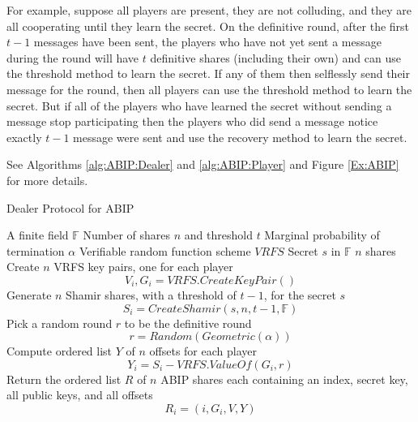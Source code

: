 \documentclass{dalcsthesis}
\begin{document}
For example, suppose all players are present, they are not colluding, and they are all cooperating until they learn the secret. On the definitive round, after the first $t-1$ messages have been sent, the players who have not yet sent a message during the round will have $t$ definitive shares (including their own) and can use the threshold method to learn the secret. If any of them then selflessly send their message for the round, then all players can use the threshold method to learn the secret. But if all of the players who have learned the secret without sending a message stop participating then the players who did send a message notice exactly $t-1$ message were sent and use the recovery method to learn the secret.

See Algorithms \ref{alg:ABIP:Dealer} and \ref{alg:ABIP:Player} and Figure \ref{Ex:ABIP} for more details.

\begin{algorithm}
  \caption{Dealer Protocol for ABIP}
  \label{alg:ABIP:Dealer}
  \begin{algorithmic}
    \INPUT A finite field $\mathbb{F}$
    \INPUT Number of shares $n$ and threshold $t$
    \INPUT Marginal probability of termination $\alpha$
    \INPUT Verifiable random function scheme $VRFS$
    \INPUT Secret $s$ in $\mathbb{F}$
    \OUTPUT $n$ shares
    \STATE Create $n$ VRFS key pairs, one for each player
    	$$V_i, G_i = VRFS.CreateKeyPair()$$
    \STATE Generate $n$ Shamir shares, with a threshold of $t-1$, for the secret $s$
    	$$S_i = CreateShamir(s, n, t - 1, \mathbb{F})$$
    \STATE Pick a random round $r$ to be the definitive round
        $$r = Random(Geometric(\alpha))$$
    \STATE Compute ordered list $Y$ of $n$ offsets for each player
    	$$Y_i = S_i - VRFS.ValueOf(G_i, r)$$
    \STATE Return the ordered list $R$ of $n$ ABIP shares each containing an index, secret key, all public keys, and all offsets 
    	$$R_i = (i, G_i, V, Y)$$
  \end{algorithmic}
\end{algorithm}
\end{document}
